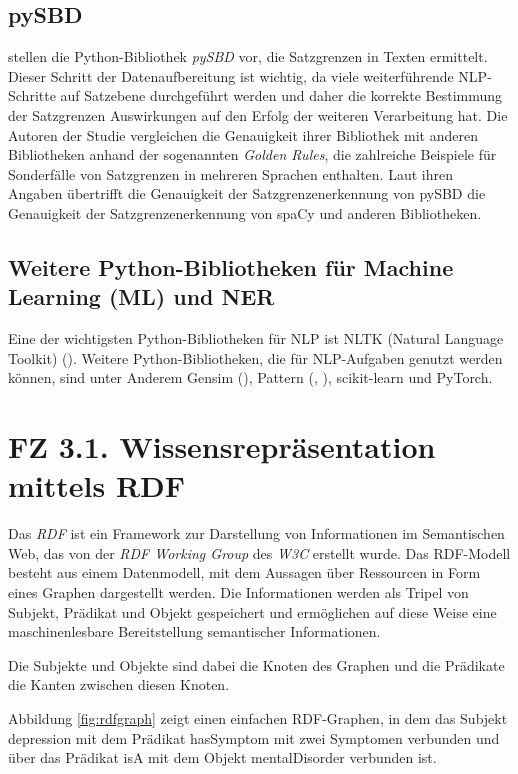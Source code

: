\subsection{pySBD}
 \cite{sadvilkar_pysbd_2020} stellen die Python-Bibliothek \emph{pySBD} vor, die Satzgrenzen in Texten ermittelt. Dieser Schritt der Datenaufbereitung ist wichtig, da viele weiterführende NLP-Schritte auf Satzebene durchgeführt werden und daher die korrekte Bestimmung der Satzgrenzen Auswirkungen auf den Erfolg der weiteren Verarbeitung hat. Die Autoren der Studie vergleichen die Genauigkeit ihrer Bibliothek mit anderen Bibliotheken anhand der sogenannten \emph{Golden Rules}, die zahlreiche Beispiele für Sonderfälle von Satzgrenzen in mehreren Sprachen enthalten. Laut ihren Angaben übertrifft die Genauigkeit der Satzgrenzenerkennung von pySBD die Genauigkeit der Satzgrenzenerkennung von spaCy und anderen Bibliotheken.

\subsection{Weitere Python-Bibliotheken für Machine Learning (ML) und NER}
Eine der wichtigsten Python-Bibliotheken für NLP ist NLTK (Natural Language Toolkit) (\cite{bird2006nltk}).
Weitere Python-Bibliotheken, die für NLP-Aufgaben genutzt werden können, sind unter Anderem
Gensim (\cite{vrehuuvrek2011gensim}), Pattern (\cite{de2012pattern}, \cite{github_pattern}), 
scikit-learn und PyTorch.

%
%
\section{FZ 3.1. Wissensrepräsentation mittels RDF}
\label{sec:fz3.1.} 

Das \emph{\ac{RDF}} \cite{w3c_all_2022} ist ein Framework zur Darstellung von Informationen im Semantischen Web, das von der \emph{RDF Working Group} des \emph{\ac{W3C}} erstellt wurde. Das RDF-Modell besteht aus einem Datenmodell, mit dem Aussagen über Ressourcen in Form eines Graphen dargestellt werden. Die Informationen werden als Tripel von Subjekt, Prädikat und Objekt gespeichert und ermöglichen auf diese Weise eine maschinenlesbare Bereitstellung semantischer Informationen.

Die Subjekte und Objekte sind dabei die Knoten des Graphen und die Prädikate die Kanten zwischen diesen Knoten.

Abbildung \ref{fig:rdfgraph} zeigt einen einfachen RDF-Graphen, in dem das Subjekt \glqq depression\grqq{} mit dem Prädikat \glqq hasSymptom\grqq{} mit zwei Symptomen verbunden und über das Prädikat \glqq isA\grqq{} mit dem Objekt \glqq mentalDisorder\grqq{} verbunden ist.

